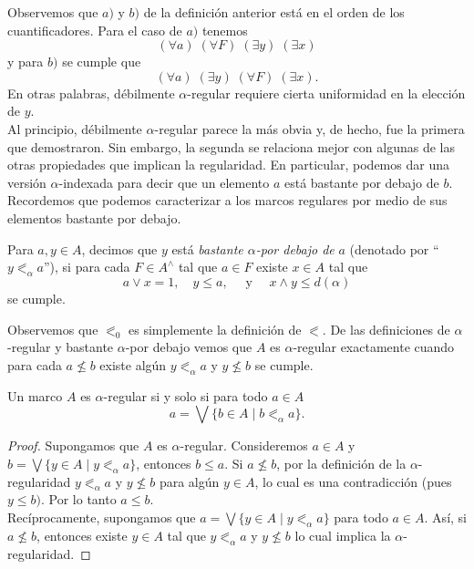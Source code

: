 Observemos que $a)$ y $b)$ de la definición anterior está en el orden de los cuantificadores. Para el caso de $a)$ tenemos 
\[
(\forall a)\; (\forall F)\; (\exists y)\; (\exists x)
\]
y para $b)$ se cumple que 
\[
(\forall a)\; (\exists y)\; (\forall F)\; (\exists x).
\]
En otras palabras, débilmente $\alpha$-regular requiere cierta uniformidad en la elección de $y$.\\

Al principio, débilmente $\alpha$-regular parece la más obvia y, de hecho, fue la primera que demostraron. Sin embargo, la segunda se relaciona mejor con algunas de las otras propiedades que implican la regularidad. En particular, podemos dar una versión $\alpha$-indexada para decir que un elemento $a$ está bastante por debajo de $b$. Recordemos que podemos caracterizar a los marcos regulares por medio de sus elementos bastante por debajo.

\begin{dfn}\label{Definicion8.3.2}
    Para $a, y\in A$, decimos que $y$ está \emph{bastante $\alpha$-por debajo de} $a$ (denotado por ``$y\eqslantless_\alpha a$''), si para cada $F\in A^\wedge$ tal que $a\in F$ existe $x\in A$ tal que 
    \[
    a\vee x=1,\quad y\leq a,\quad  \mbox{ y }\quad x\wedge y\leq d(\alpha)
    \]
    se cumple.
\end{dfn}

Observemos que $\eqslantless_0$ es simplemente la definición de $\eqslantless$. De las definiciones de $\alpha$-regular y bastante $\alpha$-por debajo vemos que $A$ es $\alpha$-regular exactamente cuando para cada $a\nleq b$ existe algún $y\eqslantless_\alpha a$ y $y\nleq b$ se cumple.

\begin{lem}\label{Lema8.3.3}
    Un marco $A$ es $\alpha$-regular si y solo si para todo $a\in A$
    \[
    a=\bigvee\{b\in A\mid b\eqslantless_\alpha a\}.
    \]
\end{lem}

\begin{proof}
    Supongamos que $A$ es $\alpha$-regular. Consideremos $a\in A$ y $b=\bigvee\{y\in A\mid y\eqslantless_\alpha a\}$, entonces $b\leq a$. Si $a\nleq b$, por la definición de la $\alpha$-regularidad $y\eqslantless_\alpha a$ y $y\nleq b$ para algún $y\in A$, lo cual es una contradicción (pues $y\leq b)$. Por lo tanto $a\leq b$.\\

    Recíprocamente, supongamos que $a=\bigvee\{y\in A\mid y\eqslantless_\alpha a\}$ para todo $a\in A$. Así, si $a\nleq b$, entonces existe $y\in A$ tal que $y\eqslantless_\alpha a$ y $y\nleq b$ lo cual implica la $\alpha$-regularidad.
\end{proof}

